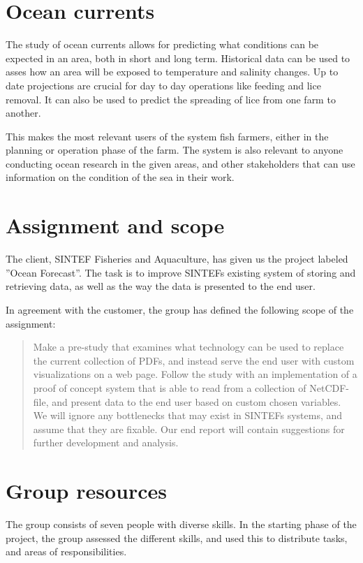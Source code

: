 \documentclass[11pt,a4paper,titlepage,oneside]{report}
\begin{document}
\section{Ocean currents}
The study of ocean currents allows for predicting what conditions can be expected in an area, both in short and long term. Historical data can be used to asses how an area will be exposed to temperature and salinity changes. Up to date projections are crucial for day to day operations like feeding and lice removal. It can also be used to predict the spreading of lice from one farm to another.

This makes the most relevant users of the system fish farmers, either in the planning or operation phase of the farm. The system is also relevant to anyone conducting ocean research in the given areas, and other stakeholders that can use information on the condition of the sea in their work.

\section{Assignment and scope}
The client, SINTEF Fisheries and Aquaculture, has given us the project labeled ”Ocean Forecast”. The task is to improve SINTEFs existing system of storing and retrieving data, as well as the way the data is presented to the end user. 

In agreement with the customer, the group has defined the following scope of the assignment:

\begin{quote}
Make a pre-study that examines what technology can be used to replace the current collection of PDFs, and instead serve the end user with custom visualizations on a web page. Follow the study with an implementation of a proof of concept system that is able to read from a collection of NetCDF-file, and present data to the end user based on custom chosen variables. We will ignore any bottlenecks that may exist in SINTEFs systems, and assume that they are fixable. Our end report will contain suggestions for further development and analysis.
\end{quote}

\section{Group resources}
The group consists of seven people with diverse skills. In the starting phase of the project, the group assessed the different skills, and used this to distribute tasks, and areas of responsibilities. 
\end{document}
